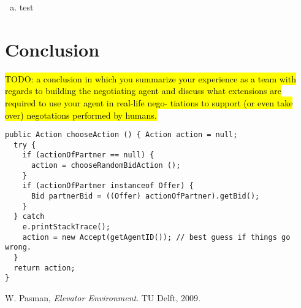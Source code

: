 \documentclass{article}
\newcommand{\todo}[1] {\hl{TODO: #1}}
\begin{document}
\begin{enumerate}[(a)]

\item{test}

\end{enumerate}

\section{Conclusion}

\todo{a conclusion in which you summarize your experience as a team with regards to building the negotiating agent and discuss what extensions are required to use your agent in real-life nego- tiations to support (or even take over) negotations performed by humans.}

\clearpage

\begin{lstlisting}
public Action chooseAction () { Action action = null;
  try {
    if (actionOfPartner == null) {
      action = chooseRandomBidAction ();
    }
    if (actionOfPartner instanceof Offer) {
      Bid partnerBid = ((Offer) actionOfPartner).getBid();
    }
  } catch
    e.printStackTrace();
    action = new Accept(getAgentID()); // best guess if things go wrong.
  }
  return action; 
}
\end{lstlisting}



\begin{thebibliography}{9}

  W. Pasman,
  \emph{Elevator Environment}.
  TU Delft,
  2009.


\end{thebibliography}
\end{document}
